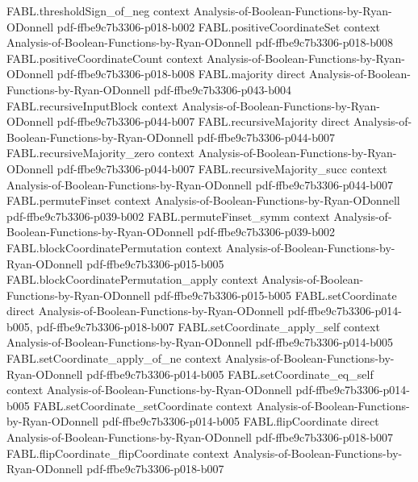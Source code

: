 \begin{theorem}
\proofstep
  {FABL.thresholdSign_of_neg}
  {context}
  {Analysis-of-Boolean-Functions-by-Ryan-ODonnell}
  {pdf-ffbe9c7b3306-p018-b002}
\proofstep
  {FABL.positiveCoordinateSet}
  {context}
  {Analysis-of-Boolean-Functions-by-Ryan-ODonnell}
  {pdf-ffbe9c7b3306-p018-b008}
\proofstep
  {FABL.positiveCoordinateCount}
  {context}
  {Analysis-of-Boolean-Functions-by-Ryan-ODonnell}
  {pdf-ffbe9c7b3306-p018-b008}
\proofstep
  {FABL.majority}
  {direct}
  {Analysis-of-Boolean-Functions-by-Ryan-ODonnell}
  {pdf-ffbe9c7b3306-p043-b004}
\proofstep
  {FABL.recursiveInputBlock}
  {context}
  {Analysis-of-Boolean-Functions-by-Ryan-ODonnell}
  {pdf-ffbe9c7b3306-p044-b007}
\proofstep
  {FABL.recursiveMajority}
  {direct}
  {Analysis-of-Boolean-Functions-by-Ryan-ODonnell}
  {pdf-ffbe9c7b3306-p044-b007}
\proofstep
  {FABL.recursiveMajority_zero}
  {context}
  {Analysis-of-Boolean-Functions-by-Ryan-ODonnell}
  {pdf-ffbe9c7b3306-p044-b007}
\proofstep
  {FABL.recursiveMajority_succ}
  {context}
  {Analysis-of-Boolean-Functions-by-Ryan-ODonnell}
  {pdf-ffbe9c7b3306-p044-b007}
\proofstep
  {FABL.permuteFinset}
  {context}
  {Analysis-of-Boolean-Functions-by-Ryan-ODonnell}
  {pdf-ffbe9c7b3306-p039-b002}
\proofstep
  {FABL.permuteFinset_symm}
  {context}
  {Analysis-of-Boolean-Functions-by-Ryan-ODonnell}
  {pdf-ffbe9c7b3306-p039-b002}
\proofstep
  {FABL.blockCoordinatePermutation}
  {context}
  {Analysis-of-Boolean-Functions-by-Ryan-ODonnell}
  {pdf-ffbe9c7b3306-p015-b005}
\proofstep
  {FABL.blockCoordinatePermutation_apply}
  {context}
  {Analysis-of-Boolean-Functions-by-Ryan-ODonnell}
  {pdf-ffbe9c7b3306-p015-b005}
\proofstep
  {FABL.setCoordinate}
  {direct}
  {Analysis-of-Boolean-Functions-by-Ryan-ODonnell}
  {pdf-ffbe9c7b3306-p014-b005,
    pdf-ffbe9c7b3306-p018-b007}
\proofstep
  {FABL.setCoordinate_apply_self}
  {context}
  {Analysis-of-Boolean-Functions-by-Ryan-ODonnell}
  {pdf-ffbe9c7b3306-p014-b005}
\proofstep
  {FABL.setCoordinate_apply_of_ne}
  {context}
  {Analysis-of-Boolean-Functions-by-Ryan-ODonnell}
  {pdf-ffbe9c7b3306-p014-b005}
\proofstep
  {FABL.setCoordinate_eq_self}
  {context}
  {Analysis-of-Boolean-Functions-by-Ryan-ODonnell}
  {pdf-ffbe9c7b3306-p014-b005}
\proofstep
  {FABL.setCoordinate_setCoordinate}
  {context}
  {Analysis-of-Boolean-Functions-by-Ryan-ODonnell}
  {pdf-ffbe9c7b3306-p014-b005}
\proofstep
  {FABL.flipCoordinate}
  {direct}
  {Analysis-of-Boolean-Functions-by-Ryan-ODonnell}
  {pdf-ffbe9c7b3306-p018-b007}
\proofstep
  {FABL.flipCoordinate_flipCoordinate}
  {context}
  {Analysis-of-Boolean-Functions-by-Ryan-ODonnell}
  {pdf-ffbe9c7b3306-p018-b007}

\end{theorem}

